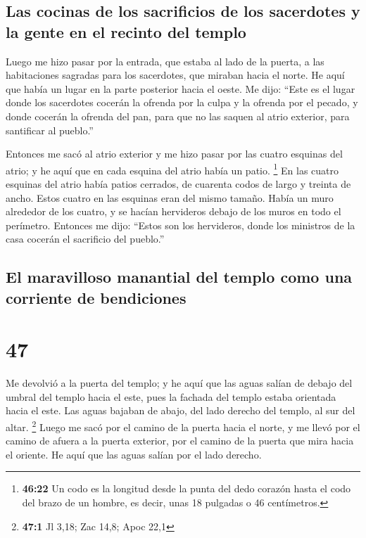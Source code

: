 \hypertarget{las-cocinas-de-los-sacrificios-de-los-sacerdotes-y-la-gente-en-el-recinto-del-templo}{%
\subsection{Las cocinas de los sacrificios de los sacerdotes y la gente
en el recinto del
templo}\label{las-cocinas-de-los-sacrificios-de-los-sacerdotes-y-la-gente-en-el-recinto-del-templo}}

 Luego me hizo pasar por la entrada, que estaba al lado
de la puerta, a las habitaciones sagradas para los sacerdotes, que
miraban hacia el norte. He aquí que había un lugar en la parte posterior
hacia el oeste.  Me dijo: ``Este es el lugar donde los
sacerdotes cocerán la ofrenda por la culpa y la ofrenda por el pecado, y
donde cocerán la ofrenda del pan, para que no las saquen al atrio
exterior, para santificar al pueblo.''

 Entonces me sacó al atrio exterior y me hizo pasar por
las cuatro esquinas del atrio; y he aquí que en cada esquina del atrio
había un patio.  \footnote{\textbf{46:22} Un codo es la
  longitud desde la punta del dedo corazón hasta el codo del brazo de un
  hombre, es decir, unas 18 pulgadas o 46 centímetros.} En las cuatro
esquinas del atrio había patios cerrados, de cuarenta codos de largo y
treinta de ancho. Estos cuatro en las esquinas eran del mismo tamaño.
 Había un muro alrededor de los cuatro, y se hacían
hervideros debajo de los muros en todo el perímetro. 
Entonces me dijo: ``Estos son los hervideros, donde los ministros de la
casa cocerán el sacrificio del pueblo.''

\hypertarget{el-maravilloso-manantial-del-templo-como-una-corriente-de-bendiciones}{%
\subsection{El maravilloso manantial del templo como una corriente de
bendiciones}\label{el-maravilloso-manantial-del-templo-como-una-corriente-de-bendiciones}}

\hypertarget{section-46}{%
\section{47}\label{section-46}}

 Me devolvió a la puerta del templo; y he aquí que las
aguas salían de debajo del umbral del templo hacia el este, pues la
fachada del templo estaba orientada hacia el este. Las aguas bajaban de
abajo, del lado derecho del templo, al sur del altar. \footnote{\textbf{47:1}
  Jl 3,18; Zac 14,8; Apoc 22,1}  Luego me sacó por el
camino de la puerta hacia el norte, y me llevó por el camino de afuera a
la puerta exterior, por el camino de la puerta que mira hacia el
oriente. He aquí que las aguas salían por el lado derecho.

